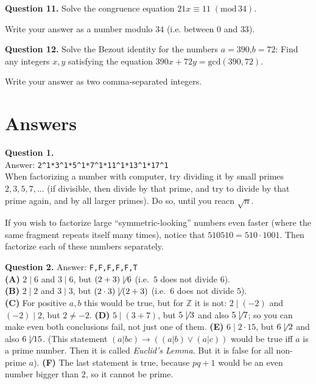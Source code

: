 \documentclass[jou]{apa6}
\begin{document}
\vspace{6pt}
{\bf Question 11.} Solve the congruence equation $21x \equiv 11\;(\text{mod}\,34)$. 

Write your answer as a number modulo $34$ (i.e. between $0$ and $33$). 

\vspace{6pt}
{\bf Question 12.} Solve the Bezout identity for the numbers $a=390$,$b=72$: Find any integers $x,y$
satisfying the equation $390x + 72y = \text{gcd}(390,72)$. 

Write your answer as two comma-separated integers.


\newpage

\section{Answers}

{\bf Question 1.}\\ 
Answer: {\tt 2\^{}1*3\^{}1*5\^{}1*7\^{}1*11\^{}1*13\^{}1*17\^{}1}\\
When factorizing a number with computer, try dividing it by small primes $2,3,5,7,\ldots$
(if divisible, then divide by that prime, and try to divide by that prime again, and by all 
larger primes). Do so, until you reacn $\sqrt{n}$.

If you wish to factorize large ``symmetric-looking'' numbers even faster (where the same 
fragment repeats itself many times), notice
that $510510 = 510 \cdot 1001$. Then 
factorize each of these numbers separately. 

\vspace{6pt}
{\bf Question 2.} Answer: {\tt F,F,F,F,F,T}\\
{\bf (A)} $2 \mid 6$ and $3 \mid 6$, but $(2+3) \not\mid 6$ (i.e.\ $5$ does not divide $6$).\\
{\bf (B)} $2 \mid 2$ and $3 \mid 3$, but $(2 \cdot 3) \not\mid (2+3)$ (i.e.\ $6$ does not divide $5$).\\
{\bf (C)} For positive $a,b$ this would be true, but for $\mathbb{Z}$ it is not: $2 \mid (-2)$ and $(-2) \mid 2$, 
but $2 \neq -2$. 
{\bf (D)} $5 \mid (3+7)$, but $5 \not\mid 3$ and also $5 \not\mid 7$; so you can make even both conclusions fail, 
not just one of them.
{\bf (E)} $6 \mid 2 \cdot 15$, but $6 \not\mid 2$ and also $6 \not\mid 15$. (This statement 
$(a | bc) \rightarrow ((a | b) \vee (a | c))$ would be true iff $a$ is a prime number. Then it is called
{\em Euclid's Lemma}. But it is false for all non-prime $a$).
{\bf (F)} The last statement is true, because $pq+1$ would be an even number bigger than $2$, so it cannot be prime.
\end{document}
